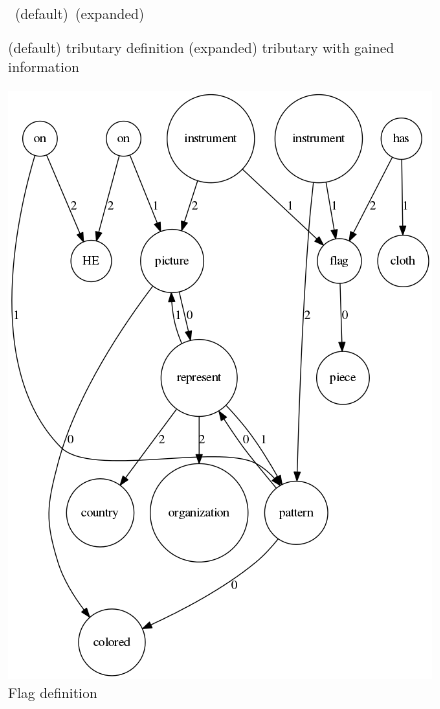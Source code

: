\documentclass[twoside,b5paper,10pt]{article}
\begin{document}
\begin{figure}[htb]
{{    }
  }
  \vspace{3pt}
  \hbox{\hspace{0.13\columnwidth} (default) \hspace{0.3\columnwidth} (expanded)}
  \caption{ (default) tributary definition (expanded) tributary with gained information}
  \label{fig:tributary}
\end{figure}

\begin{figure}[htb]
  \centerline{\includegraphics[scale=0.3]{Figure/flag.png}}
  \caption{Flag definition}
  \label{fig:flag}
 \end{figure}
\end{document}
